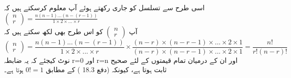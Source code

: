 اسی طرح سے تسلسل کو جاری رکھتے ہوئے آپ معلوم کرسکتے ہیں کہ 
      \(\begin{pmatrix}
     n\\r
     \end{pmatrix}
     =\frac{n(n-1)...(n-(r-1))}{1\times2\times...\times r}\)\\
آپ 
      \(\begin{pmatrix}
     n\\r
     \end{pmatrix}\)
  کو اس طرح بھی لکھ سکتے ہیں کہ 
   \[\begin{pmatrix}
     n\\r
     \end{pmatrix}
     =\frac{n(n-1)...(n-(r-1))}{1\times2\times...\times r}\times \frac{(n-r)\times(n-r-1)\times ...\times 2\times1}{(n-r)\times(n-r-1)\times...\times2\times1}=\frac{n!}{r!(n-r)!}\]
نوٹ کیجئے کہ یہ ضابطہ
r=0
  اور
r=n
  اور ان کے درمیان تمام قیمتوں کے لئے صحیح ثابت ہوتا ہے،
  کیونکہ  (دفع  
18.3
) کے مطابق  
\(0!=1\)
  ہوتا ہے۔


